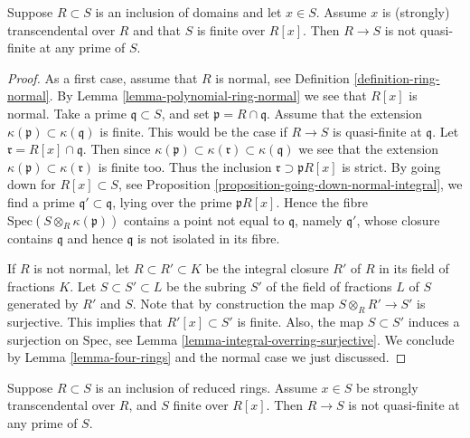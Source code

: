 \begin{lemma}
\label{lemma-domains-transcendental-not-quasi-finite}
Suppose $R\subset S$ is an inclusion of domains and
let $x \in S$. Assume $x$ is (strongly) transcendental over $R$
and that $S$ is finite over $R[x]$. Then $R\to S$ is not
quasi-finite at any prime of $S$.
\end{lemma}

\begin{proof}
As a first case, assume that $R$ is normal, see
Definition \ref{definition-ring-normal}.
By Lemma \ref{lemma-polynomial-ring-normal}
we see that $R[x]$ is normal.
Take a prime $\mathfrak q \subset S$,
and set $\mathfrak p = R \cap \mathfrak q$.
Assume that the extension $\kappa(\mathfrak p)
\subset \kappa(\mathfrak q)$ is finite.
This would be the case if $R \to S$ is
quasi-finite at $\mathfrak q$.
Let $\mathfrak r = R[x] \cap \mathfrak q$.
Then since $\kappa(\mathfrak p)
\subset \kappa(\mathfrak r) \subset \kappa(\mathfrak q)$
we see that the extension $\kappa(\mathfrak p)
\subset \kappa(\mathfrak r)$ is finite too.
Thus the inclusion $\mathfrak r \supset \mathfrak p R[x]$
is strict. By going down for $R[x] \subset S$,
see Proposition \ref{proposition-going-down-normal-integral},
we find a prime $\mathfrak q' \subset \mathfrak q$,
lying over the prime $\mathfrak pR[x]$. Hence
the fibre $\text{Spec}(S \otimes_R \kappa(\mathfrak p))$
contains a point not equal to $\mathfrak q$,
namely $\mathfrak q'$, whose closure contains $\mathfrak q$ and hence
$\mathfrak q$ is not isolated in its fibre.

\medskip\noindent
If $R$ is not normal, let $R \subset R' \subset K$ be
the integral closure $R'$ of $R$ in its field of fractions
$K$. Let $S \subset S' \subset L$ be the subring $S'$ of
the field of fractions $L$ of $S$ generated by $R'$ and
$S$. Note that by construction the map $S \otimes_R R'
\to S'$ is surjective. This implies that $R'[x] \subset S'$
is finite. Also, the map $S \subset S'$
induces a surjection on $\text{Spec}$, see
Lemma \ref{lemma-integral-overring-surjective}.
We conclude by Lemma \ref{lemma-four-rings} and the normal case
we just discussed.
\end{proof}

\begin{lemma}
\label{lemma-reduced-strongly-transcendental-not-quasi-finite}
Suppose $R \subset S$ is an inclusion of reduced rings.
Assume $x \in S$ be strongly transcendental over $R$,
and $S$ finite over $R[x]$. Then $R\to S$ is not
quasi-finite at any prime of $S$.
\end{lemma}

